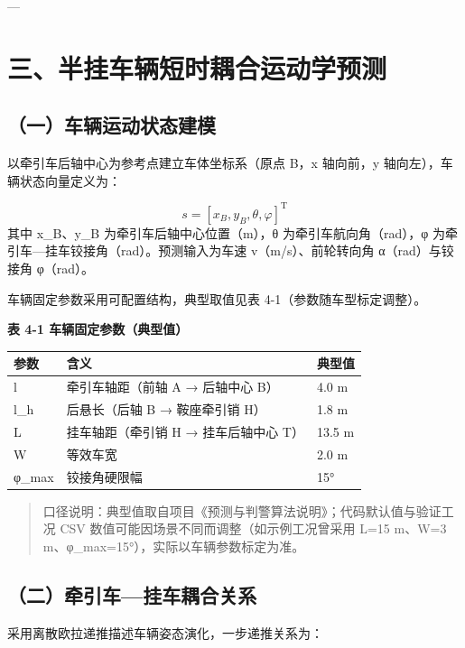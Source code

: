 \documentclass[UTF8,11pt]{ctexart}
\begin{document}
---

\section*{三、半挂车辆短时耦合运动学预测}
\subsection*{（一）车辆运动状态建模}
以牵引车后轴中心为参考点建立车体坐标系（原点 B，x 轴向前，y 轴向左），车辆状态向量定义为：

\begin{equation}
s = [x_B, y_B, \theta, \varphi]^{\mathrm{T}}
\end{equation}
其中 x\_B、y\_B 为牵引车后轴中心位置（m），θ 为牵引车航向角（rad），φ 为牵引车—挂车铰接角（rad）。预测输入为车速 v（m/s）、前轮转向角 α（rad）与铰接角 φ（rad）。

车辆固定参数采用可配置结构，典型取值见表 4-1（参数随车型标定调整）。

\textbf{表 4-1 车辆固定参数（典型值）}

\begin{center}
\small
\begin{tabular}{p{3.2cm}p{7.4cm}p{2.6cm}}
\hline
\textbf{参数} & \textbf{含义} & \textbf{典型值} \\
\hline
l & 牵引车轴距（前轴 A → 后轴中心 B） & 4.0 m \\
\hline
l\_h & 后悬长（后轴 B → 鞍座牵引销 H） & 1.8 m \\
\hline
L & 挂车轴距（牵引销 H → 挂车后轴中心 T） & 13.5 m \\
\hline
W & 等效车宽 & 2.0 m \\
\hline
φ\_max & 铰接角硬限幅 & 15° \\
\hline
\end{tabular}
\end{center}
\begin{quote}\small
口径说明：典型值取自项目《预测与判警算法说明》；代码默认值与验证工况 CSV 数值可能因场景不同而调整（如示例工况曾采用 L=15 m、W=3 m、φ\_max=15°），实际以车辆参数标定为准。
\end{quote}
\subsection*{（二）牵引车—挂车耦合关系}
采用离散欧拉递推描述车辆姿态演化，一步递推关系为：
\end{document}
